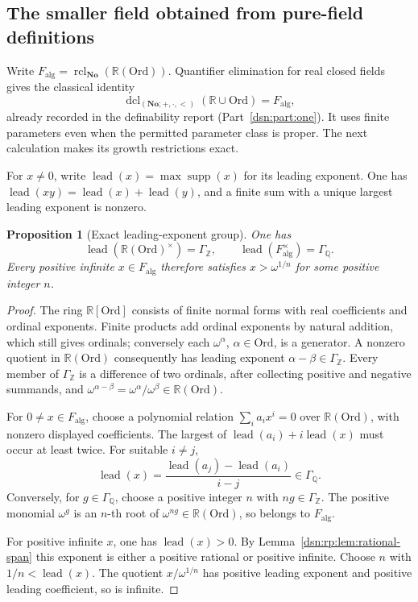 \documentclass[11pt,a4paper]{article}
\numberwithin{equation}{section}
\newtheorem{proposition}[proposition]{Proposition}
\theoremstyle{definition}
\theoremstyle{remark}
\newcommand{\No}{\mathbf{No}}
\newcommand{\Ord}{\mathrm{Ord}}
\newcommand{\Z}{\mathbb Z}
\newcommand{\Q}{\mathbb Q}
\newcommand{\R}{\mathbb R}
\newcommand{\supp}{\operatorname{supp}}
\begin{document}
\subsection{The smaller field obtained from pure-field definitions}

Write \(F_{\mathrm{alg}}=\operatorname{rcl}_{\No}(\R(\Ord))\).
Quantifier elimination for real closed fields gives the classical
identity
\[
 \operatorname{dcl}_{(\No;+,\cdot,<)}(\R\cup\Ord)=F_{\mathrm{alg}},
\]
already recorded in the definability report (Part~\ref{dsn:part:one}).
It uses finite parameters even when the permitted parameter class
is proper. The next calculation makes its growth restrictions exact.

For \(x\ne0\), write \(\operatorname{lead}(x)=\max\supp(x)\) for its leading exponent.
One has \(\operatorname{lead}(xy)=\operatorname{lead}(x)+\operatorname{lead}(y)\), and a finite sum with a unique
largest leading exponent is nonzero.

\begin{proposition}[Exact leading-exponent group]\label{dsn:rp:prop:value-group}
One has
\[
 \operatorname{lead}(\R(\Ord)^\times)=\Gamma_{\Z},\qquad
 \operatorname{lead}(F_{\mathrm{alg}}^\times)=\Gamma_{\Q}.
\]
Every positive infinite \(x\in F_{\mathrm{alg}}\) therefore satisfies
\(x>\omega^{1/n}\) for some positive integer \(n\).
\end{proposition}

\begin{proof}
The ring \(\R[\Ord]\) consists of finite normal forms with real
coefficients and ordinal exponents. Finite products add ordinal
exponents by natural addition, which still gives ordinals;
conversely each \(\omega^\alpha\), \(\alpha\in\Ord\), is a generator.
A nonzero quotient in \(\R(\Ord)\) consequently has leading exponent
\(\alpha-\beta\in \Gamma_{\Z}\). Every member of \(\Gamma_{\Z}\) is a difference of two
ordinals, after collecting positive and negative summands, and
\(\omega^{\alpha-\beta}=\omega^\alpha/\omega^\beta\in \R(\Ord)\).

For \(0\ne x\in F_{\mathrm{alg}}\), choose a polynomial relation
\(\sum_i a_i x^i=0\) over \(\R(\Ord)\), with nonzero displayed coefficients.
The largest of \(\operatorname{lead}(a_i)+i\operatorname{lead}(x)\) must occur at least twice.
For suitable \(i\ne j\),
\[
 \operatorname{lead}(x)=\frac{\operatorname{lead}(a_j)-\operatorname{lead}(a_i)}{i-j}\in \Gamma_{\Q}.
\]
Conversely, for \(g\in \Gamma_{\Q}\), choose a positive integer \(n\) with
\(ng\in \Gamma_{\Z}\). The positive monomial \(\omega^g\) is an \(n\)-th root
of \(\omega^{ng}\in \R(\Ord)\), so belongs to \(F_{\mathrm{alg}}\).

For positive infinite \(x\), one has \(\operatorname{lead}(x)>0\).
By Lemma~\ref{dsn:rp:lem:rational-span} this exponent is either a positive
rational or positive infinite. Choose \(n\) with \(1/n<\operatorname{lead}(x)\).
The quotient \(x/\omega^{1/n}\) has positive leading exponent and
positive leading coefficient, so is infinite.
\end{proof}
\end{document}

